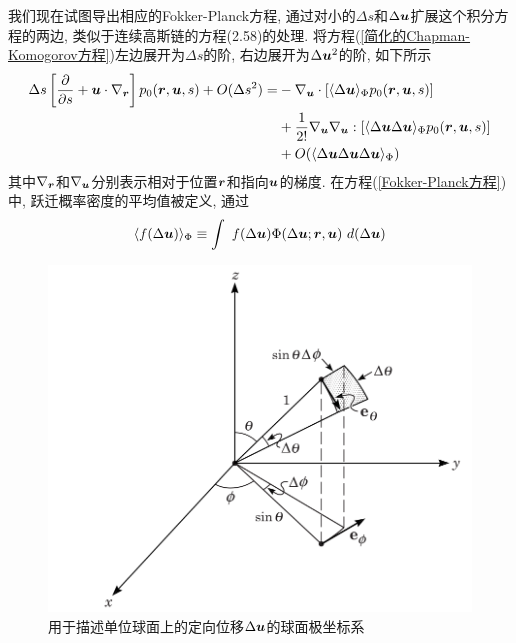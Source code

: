 我们现在试图导出相应的Fokker-Planck方程, 通过对小的$\Delta s$和$\Delta \bm{u}$扩展这个积分方程的两边, 类似于连续高斯链的方程(2.58)的处理. 将方程(\ref{简化的Chapman-Komogorov方程})左边展开为$\Delta s$的阶, 右边展开为$\Delta \bm{u}^2$的阶, 如下所示\\
\begin{equation}
\begin{aligned}
	\Delta s \left[\frac{\partial}{\partial s}+\bm{u}\cdot\nabla_{\bm{r}}\right]p_0(\bm{r},\bm{u},s)+O(\Delta s^2)=&-\nabla_{\bm{u}} \cdot [\langle \Delta \bm{u}\rangle_\Phi p_0(\bm{r},\bm{u},s)]\\&+\frac{1}{2!}\nabla_{\bm{u}} \nabla_{\bm{u}} :[\langle\Delta \bm{u}\Delta \bm{u} \rangle_\Phi p_0(\bm{r},\bm{u},s)]\\&+O(\langle \Delta \bm{u} \Delta \bm{u}\Delta \bm{u}\rangle_\Phi) \label{Fokker-Planck方程}
\end{aligned}
\end{equation}
其中$\nabla_{\bm{r}}$和$\nabla_{\bm{u}}$分别表示相对于位置$\bm{r}$和指向$\bm{u}$的梯度. 在方程(\ref{Fokker-Planck方程})中, 跃迁概率密度的平均值被定义, 通过
\begin{equation}
\langle f(\Delta \bm{u})\rangle _\Phi\equiv\int \ f(\Delta \bm{u} )\Phi(\Delta \bm{u};\bm{r},\bm{u})\ d(\Delta \bm{u})
\end{equation}
\begin{figure}[H]
	\centering   
	\includegraphics[width=12cm]{./figures/7.png}
	\caption{用于描述单位球面上的定向位移$\Delta \bm{u}$的球面极坐标系}
	\label{用于描述单位球面上的定向位移的球面极坐标系}
\end{figure}

